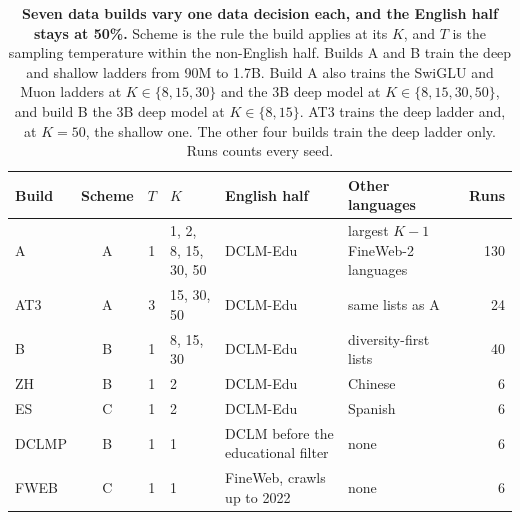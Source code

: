 \begin{table}[t]
\centering
\small
\setlength{\tabcolsep}{4pt}
\begin{tabular*}{\textwidth}{@{\extracolsep{\fill}}lcclllr@{}}
\toprule
Build & Scheme & $T$ & $K$ & English half & Other languages & Runs \\
\midrule
A & A & 1 & 1, 2, 8, 15, 30, 50 & DCLM-Edu & largest $K-1$ FineWeb-2 languages & 130 \\
AT3 & A & 3 & 15, 30, 50 & DCLM-Edu & same lists as A & 24 \\
B & B & 1 & 8, 15, 30 & DCLM-Edu & diversity-first lists & 40 \\
ZH & B & 1 & 2 & DCLM-Edu & Chinese & 6 \\
ES & C & 1 & 2 & DCLM-Edu & Spanish & 6 \\
DCLMP & B & 1 & 1 & DCLM before the educational filter & none & 6 \\
FWEB & C & 1 & 1 & FineWeb, crawls up to 2022 & none & 6 \\
\bottomrule
\end{tabular*}
\caption{\textbf{Seven data builds vary one data decision each, and the English half stays at 50\%.} Scheme is the rule the build applies at its $K$, and $T$ is the sampling temperature within the non-English half. Builds A and B train the deep and shallow ladders from 90M to 1.7B. Build A also trains the SwiGLU and Muon ladders at $K \in \{8, 15, 30\}$ and the 3B deep model at $K \in \{8, 15, 30, 50\}$, and build B the 3B deep model at $K \in \{8, 15\}$. AT3 trains the deep ladder and, at $K=50$, the shallow one. The other four builds train the deep ladder only. Runs counts every seed.}
\label{tab:card-builds}
\end{table}

